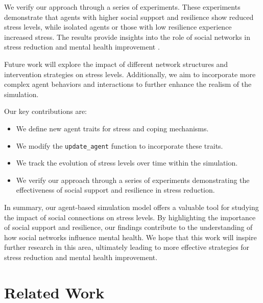 \documentclass{article} %
\begin{document}
We verify our approach through a series of experiments. These experiments demonstrate that agents with higher social support and resilience show reduced stress levels, while isolated agents or those with low resilience experience increased stress. The results provide insights into the role of social networks in stress reduction and mental health improvement \citep{poledna2023economic}.

Future work will explore the impact of different network structures and intervention strategies on stress levels. Additionally, we aim to incorporate more complex agent behaviors and interactions to further enhance the realism of the simulation.

Our key contributions are:
\begin{itemize}
    \item We define new agent traits for stress and coping mechanisms.
    \item We modify the \texttt{update\_agent} function to incorporate these traits.
    \item We track the evolution of stress levels over time within the simulation.
    \item We verify our approach through a series of experiments demonstrating the effectiveness of social support and resilience in stress reduction.
\end{itemize}

In summary, our agent-based simulation model offers a valuable tool for studying the impact of social connections on stress levels. By highlighting the importance of social support and resilience, our findings contribute to the understanding of how social networks influence mental health. We hope that this work will inspire further research in this area, ultimately leading to more effective strategies for stress reduction and mental health improvement.

\section{Related Work}
\label{sec:related}
\end{document}
